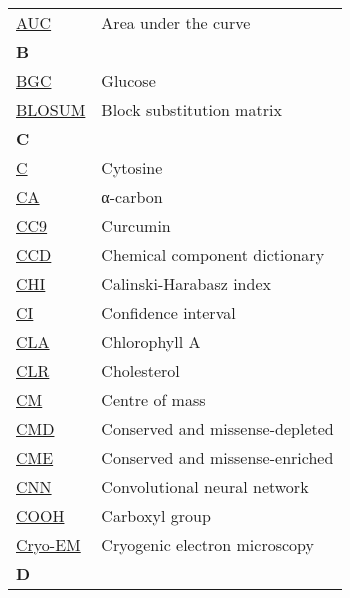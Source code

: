 \begin{longtable}[l]{@{}p{2.5cm}p{12cm}@{}}
\textmd{\href{https://en.wikipedia.org/wiki/Receiver_operating_characteristic}{AUC}} & Area under the curve \\[0.3175cm]
\textbf{\large B} & \\[0.25cm]
\textmd{\href{https://www.ebi.ac.uk/pdbe-srv/pdbechem/chemicalCompound/show/BGC}{BGC}} & Glucose \\
\textmd{\href{https://en.wikipedia.org/wiki/BLOSUM}{BLOSUM}} & Block substitution matrix \\[0.3175cm]
\textbf{\large C} & \\[0.25cm]
\textmd{\href{https://en.wikipedia.org/wiki/Cytosine}{C}} & Cytosine \\
\textmd{\href{https://en.wikipedia.org/wiki/Amino_acid\#Chirality}{CA}} & α-carbon \\
\textmd{\href{https://www.ebi.ac.uk/pdbe-srv/pdbechem/chemicalCompound/show/CC9}{CC9}} & Curcumin \\
\textmd{\href{https://www.wwpdb.org/data/ccd}{CCD}} & Chemical component dictionary \\
\textmd{\href{https://en.wikipedia.org/wiki/Calinski–Harabasz_index}{CHI}} & Calinski-Harabasz index \\
\textmd{\href{https://en.wikipedia.org/wiki/Confidence_interval}{CI}} & Confidence interval \\
\textmd{\href{https://www.ebi.ac.uk/pdbe-srv/pdbechem/chemicalCompound/show/CLA}{CLA}} & Chlorophyll A \\
\textmd{\href{https://www.ebi.ac.uk/pdbe-srv/pdbechem/chemicalCompound/show/CLR}{CLR}} & Cholesterol \\
\textmd{\href{https://en.wikipedia.org/wiki/Center_of_mass}{CM}} & Centre of mass \\
\textmd{\href{https://www.nature.com/articles/s42003-024-06117-5}{CMD}} & Conserved and missense-depleted \\
\textmd{\href{https://www.nature.com/articles/s42003-024-06117-5}{CME}} & Conserved and missense-enriched \\
\textmd{\href{https://en.wikipedia.org/wiki/Convolutional_neural_network}{CNN}} & Convolutional neural network \\
\textmd{\href{https://en.wikipedia.org/wiki/Carboxylic_acid}{COOH}} & Carboxyl group \\
\textmd{\href{https://en.wikipedia.org/wiki/Cryogenic_electron_microscopy}{Cryo-EM}} & Cryogenic electron microscopy \\[0.3175cm]
\textbf{\large D} & \\[0.25cm]

\end{longtable}
